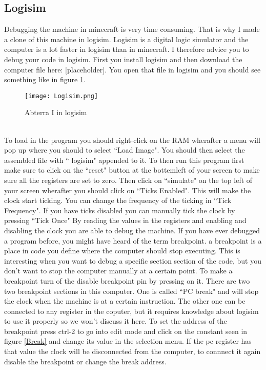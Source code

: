 \documentclass{article}
\newcommand{\LogComp}{[placeholder]}
\begin{document}
\subsection{Logisim\label{logisim}}
Debugging the machine in minecraft is very time consuming. That is why I made a clone of this machine in logisim. Logisim is a digital logic simulator and the computer is a lot faster in logisim than in minecraft. I therefore advice you to debug your code in logisim. First you install logisim and then download the computer file here: \LogComp. You open that file in logisim and you should see something like in figure \ref{logisimI}.

\begin{figure}[h]
	\centering
	\texttt{[image: Logisim.png]}
	\caption{Abterra I in logisim\label{logisimI}}
\end{figure}
~\\
To load in the program you should right-click on the RAM wherafter a menu will pop up where you should to select ``Load Image". You should then select the assembled file with `` logisim" appended to it. To then run this program first make sure to click on the ``reset" button at the bottemleft of your screen to make sure all the registers are set to zero. Then click on ``simulate" on the top left of your screen wherafter you should click on ``Ticks Enabled". This will make the clock start ticking. You can change the frequency of the ticking in ``Tick Frequency". If you have ticks disabled you can manually tick the clock by pressing ``Tick Once" By reading the values in the registers and enabling and disabling the clock you are able to debug the machine. If you have ever debugged a program before, you might have heard of the term breakpoint. a breakpoint is a place in code you define where the computer should stop executing. This is interesting when you want to debug a specific section section of the code, but you don't want to stop the computer manually at a certain point. To make a breakpoint turn of the disable breakpoint pin by pressing on it. There are two two breakpoint sections in this computer. One is called ``PC break" and will stop the clock when the machine is at a certain instruction. The other one can be connected to any register in the coputer, but it requires knowledge about logisim to use it properly so we won't discuss it here. To set the address of the breakpoint press ctrl-2 to go into edit mode and click on the constant seen in figure \ref{Break} and change its value in the selection menu. If the pc register has that value the clock will be disconnected from the computer, to connnect it again disable the breakpoint or change the break address.
\end{document}
